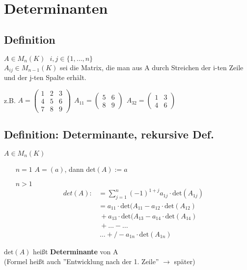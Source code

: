  
\section{Determinanten}

\subsection{Definition}
$A\in M_n(K) \ \ \ i,j\in\lbrace 1,\dots,n\rbrace$\\
$A_{ij}\in M_{n-1}(K)$ sei die Matrix, die man aus A durch Streichen der i-ten Zeile und der j-ten Spalte erhält.

z.B. $A=\begin{pmatrix}1 & 2 & 3 \\ 4 & 5 & 6 \\  7 & 8 & 9\end{pmatrix} \ \ A_{11}=\begin{pmatrix}5 & 6 \\ 8 & 9\end{pmatrix} \ \ A_{32}=\begin{pmatrix}1 & 3 \\ 4 & 6\end{pmatrix}$

\subsection{Definition: Determinante, rekursive Def.}
$A\in M_n(K)$
\begin{itemize}
	\item[$n=1$] $A=(a)$, dann $\mathrm{det}(A):=a$
	\item[$n>1$] \begin{align*}
	{det}(A):&=\sum_{j=1}^n (-1)^{1+j}a_{1j}\cdot \mathrm{det}(A_{1j})\\
	&=a_{11}\cdot \mathrm{det}(A_{11}-a_{12}\cdot \mathrm{det}(A_{12})\\
	& \ +a_{13}\cdot \mathrm{det}(A_{13}-a_{14}\cdot \mathrm{det}(A_{14})\\
	& \ +\dots -\dots\\
	& \ \dots +/- a_{1n}\cdot \mathrm{det}(A_{1n})
	\end{align*}
\end{itemize}
$\mathrm{det}(A)$ heißt \textbf{Determinante} von A\\
(Formel heißt auch ''Entwicklung nach der 1. Zeile'' $\rightarrow$ später)

